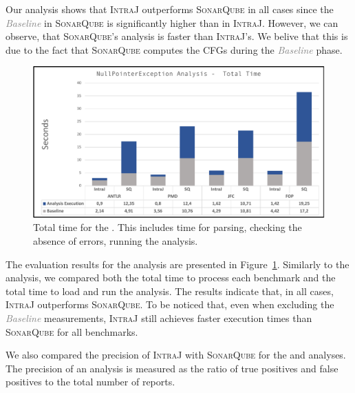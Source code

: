 Our analysis shows that \textsc{IntraJ} outperforms \textsc{SonarQube} in all 
cases since the \textcolor{grey}{\emph{Baseline}} in \textsc{SonarQube} is 
significantly higher than in \textsc{IntraJ}. However, we can observe, 
that \textsc{SonarQube}'s  analysis is faster than \textsc{IntraJ}'s.
We belive that this is due to the fact that \textsc{SonarQube} computes the 
CFGs during the \textcolor{grey}{\emph{Baseline}} phase.


\begin{figure}[H]
  \includegraphics[width=1\linewidth]{kappa/img/NPETotalTime.pdf}
  \caption{\label{fig:NPETotal}Total time for the . This includes time for parsing,
  checking the absence of errors, running the analysis.}
\end{figure}


The evaluation results for the  analysis are presented in 
Figure~\ref{fig:NPETotal}. Similarly to the  analysis, we
compared both the total time to process each benchmark and the total time
to load and run the analysis.
The results indicate that, in all cases, \textsc{IntraJ} outperforms \textsc{SonarQube}.
To be noticed that, even when excluding the \textcolor{grey}{\emph{Baseline}} measurements, \textsc{IntraJ} 
still achieves faster execution times than \textsc{SonarQube} for all benchmarks.

We also compared the precision of \textsc{IntraJ} with \textsc{SonarQube} for the
 and  analyses. 
The precision of an analysis is measured as the ratio of true positives and false 
positives to the total number of reports.

